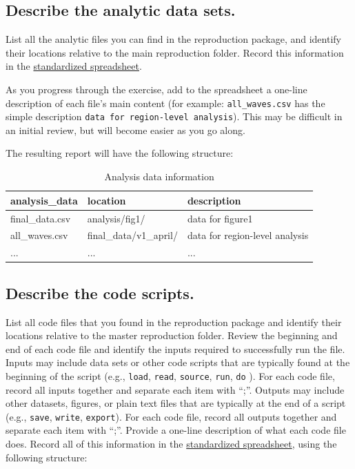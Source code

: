 \documentclass[
]{book}
\begin{document}
\hypertarget{desc-analy}{%
\subsection{Describe the analytic data sets.}\label{desc-analy}}

List all the analytic files you can find in the reproduction package, and identify their locations relative to the main reproduction folder. Record this information in the \href{https://docs.google.com/spreadsheets/d/1LUIdVFH0OfR70C7z07TYeE-uWzKI_JIeWUMaYhqEKK0/edit\#gid=1299317837\&range=A1}{standardized spreadsheet}.

As you progress through the exercise, add to the spreadsheet a one-line description of each file's main content (for example: \texttt{all\_waves.csv} has the simple description \texttt{data\ for\ region-level\ analysis}). This may be difficult in an initial review, but will become easier as you go along.

The resulting report will have the following structure:

\begin{table}

\caption{\label{tab:analysis-data-information}Analysis data information}
\centering
\begin{tabu} to 
\hline
analysis\_data & location & description\\
\hline
final\_data.csv & analysis/fig1/ & data for figure1\\
\hline
all\_waves.csv & final\_data/v1\_april/ & data for region-level analysis\\
\hline
... & ... & ...\\
\hline
\end{tabu}
\end{table}

\hypertarget{desc-scripts}{%
\subsection{Describe the code scripts.}\label{desc-scripts}}

List all code files that you found in the reproduction package and identify their locations relative to the master reproduction folder. Review the beginning and end of each code file and identify the inputs required to successfully run the file. Inputs may include data sets or other code scripts that are typically found at the beginning of the script (e.g., \texttt{load}, \texttt{read}, \texttt{source}, \texttt{run}, \texttt{do} ). For each code file, record all inputs together and separate each item with ``;''. Outputs may include other datasets, figures, or plain text files that are typically at the end of a script (e.g., \texttt{save}, \texttt{write}, \texttt{export}). For each code file, record all outputs together and separate each item with ``;''. Provide a one-line description of what each code file does. Record all of this information in the \href{https://docs.google.com/spreadsheets/d/1LUIdVFH0OfR70C7z07TYeE-uWzKI_JIeWUMaYhqEKK0/edit\#gid=1617799822\&range=A1}{standardized spreadsheet}, using the following structure:
\end{document}
